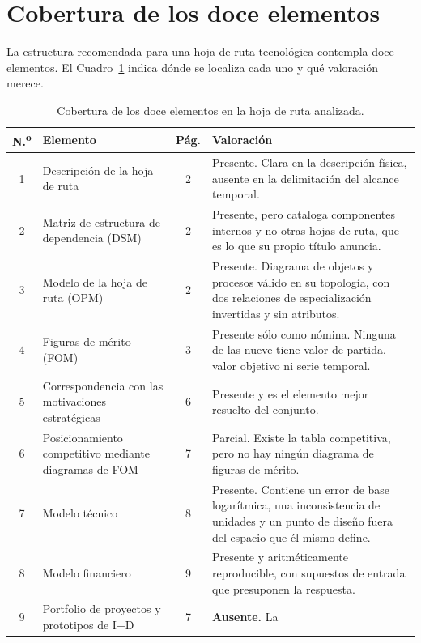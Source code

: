 \documentclass[11pt,letterpaper]{article}
\begin{document}
\section{Cobertura de los doce elementos}

La estructura recomendada para una hoja de ruta tecnológica contempla doce
elementos. El Cuadro~\ref{tab:cobertura} indica dónde se localiza cada uno y
qué valoración merece.

\begin{table}[ht]
  \centering
  \footnotesize
  \caption{Cobertura de los doce elementos en la hoja de ruta analizada.}
  \label{tab:cobertura}
  \begin{tabularx}{\textwidth}{@{}c>{\raggedright\arraybackslash}p{}
    c>{\raggedright\arraybackslash}X@{}}
    \toprule
    \textbf{N.\textsuperscript{o}} & \textbf{Elemento} & \textbf{Pág.} &
    \textbf{Valoración} \\
    \midrule
    1 & Descripción de la hoja de ruta & 2 & Presente. Clara en la
      descripción física, ausente en la delimitación del alcance temporal. \\
    2 & Matriz de estructura de dependencia (DSM) & 2 & Presente, pero
      cataloga componentes internos y no otras hojas de ruta, que es lo que su
      propio título anuncia. \\
    3 & Modelo de la hoja de ruta (OPM) & 2 & Presente. Diagrama de objetos y
      procesos válido en su topología, con dos relaciones de especialización
      invertidas y sin atributos. \\
    4 & Figuras de mérito (FOM) & 3 & Presente sólo como nómina. Ninguna de
      las nueve tiene valor de partida, valor objetivo ni serie temporal. \\
    5 & Correspondencia con las motivaciones estratégicas & 6 & Presente y es
      el elemento mejor resuelto del conjunto. \\
    6 & Posicionamiento competitivo mediante diagramas de FOM & 7 & Parcial.
      Existe la tabla competitiva, pero no hay ningún diagrama de figuras de
      mérito. \\
    7 & Modelo técnico & 8 & Presente. Contiene un error de base logarítmica,
      una inconsistencia de unidades y un punto de diseño fuera del espacio
      que él mismo define. \\
    8 & Modelo financiero & 9 & Presente y aritméticamente reproducible, con
      supuestos de entrada que presuponen la respuesta. \\
    9 & Portfolio de proyectos y prototipos de I+D & 7 & \textbf{Ausente.} La

\end{tabularx}
\end{table}
\end{document}

